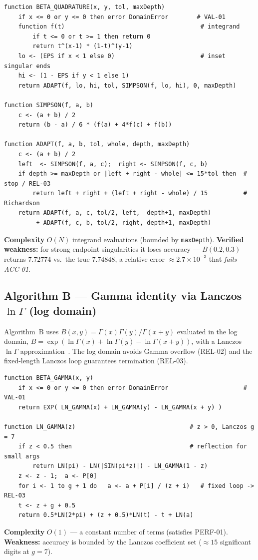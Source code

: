 \documentclass[11pt,a4paper]{article}
\begin{document}
\begin{lstlisting}[style=pseudo]
function BETA_QUADRATURE(x, y, tol, maxDepth)
    if x <= 0 or y <= 0 then error DomainError        # VAL-01
    function f(t)                                      # integrand
        if t <= 0 or t >= 1 then return 0
        return t^(x-1) * (1-t)^(y-1)
    lo <- (EPS if x < 1 else 0)                        # inset singular ends
    hi <- (1 - EPS if y < 1 else 1)
    return ADAPT(f, lo, hi, tol, SIMPSON(f, lo, hi), 0, maxDepth)

function SIMPSON(f, a, b)
    c <- (a + b) / 2
    return (b - a) / 6 * (f(a) + 4*f(c) + f(b))

function ADAPT(f, a, b, tol, whole, depth, maxDepth)
    c <- (a + b) / 2
    left  <- SIMPSON(f, a, c);  right <- SIMPSON(f, c, b)
    if depth >= maxDepth or |left + right - whole| <= 15*tol then  # stop / REL-03
        return left + right + (left + right - whole) / 15          # Richardson
    return ADAPT(f, a, c, tol/2, left,  depth+1, maxDepth)
         + ADAPT(f, c, b, tol/2, right, depth+1, maxDepth)
\end{lstlisting}
\noindent\textbf{Complexity} $O(N)$ integrand evaluations (bounded by \texttt{maxDepth}).
\textbf{Verified weakness:} for strong endpoint singularities it loses accuracy ---
$B(0.2,0.3)$ returns $7.72774$ vs.\ the true $7.74848$, a relative error $\approx
2.7\times10^{-3}$ that \emph{fails ACC-01}.

\subsection{Algorithm B --- Gamma identity via Lanczos $\ln\Gamma$ (log domain)}
Algorithm~B uses $B(x,y)=\Gamma(x)\Gamma(y)/\Gamma(x+y)$ evaluated in the log domain,
$B=\exp(\ln\Gamma(x)+\ln\Gamma(y)-\ln\Gamma(x+y))$, with a Lanczos $\ln\Gamma$
approximation~\cite{lanczos1964gamma,press2007numerical}. The log domain avoids Gamma
overflow (REL-02) and the fixed-length Lanczos loop guarantees termination (REL-03).

\begin{lstlisting}[style=pseudo]
function BETA_GAMMA(x, y)
    if x <= 0 or y <= 0 then error DomainError                     # VAL-01
    return EXP( LN_GAMMA(x) + LN_GAMMA(y) - LN_GAMMA(x + y) )

function LN_GAMMA(z)                                # z > 0, Lanczos g = 7
    if z < 0.5 then                                 # reflection for small args
        return LN(pi) - LN(|SIN(pi*z)|) - LN_GAMMA(1 - z)
    z <- z - 1;  a <- P[0]
    for i <- 1 to g + 1 do   a <- a + P[i] / (z + i)   # fixed loop -> REL-03
    t <- z + g + 0.5
    return 0.5*LN(2*pi) + (z + 0.5)*LN(t) - t + LN(a)
\end{lstlisting}
\noindent\textbf{Complexity} $O(1)$ --- a constant number of terms (satisfies PERF-01).
\textbf{Weakness:} accuracy is bounded by the Lanczos coefficient set ($\approx 15$
significant digits at $g=7$).
\end{document}
